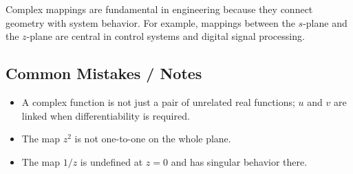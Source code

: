 \begin{noteBox}
    Complex mappings are fundamental in engineering because they connect geometry with system behavior. For example, mappings between the $s$-plane and the $z$-plane are central in control systems and digital signal processing.
\end{noteBox}

\subsection*{Common Mistakes / Notes}

\begin{itemize}
    \item A complex function is not just a pair of unrelated real functions; $u$ and $v$ are linked when differentiability is required.
    \item The map $z^2$ is not one-to-one on the whole plane.
    \item The map $1/z$ is undefined at $z=0$ and has singular behavior there.
\end{itemize}